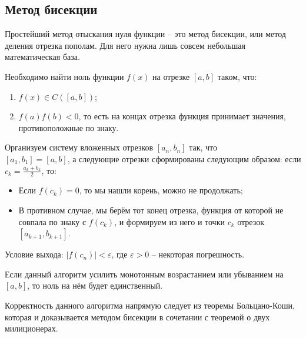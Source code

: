 \documentclass[../main.tex]{subfile}
\begin{document}
\subsection{Метод бисекции}

Простейший метод отыскания нуля функции -- это метод бисекции, или метод
деления отрезка пополам. Для него нужна лишь совсем небольшая математическая
база.

\begin{algorithm}\label{eq:bisection_method}
	Необходимо найти ноль функции $f(x)$ на отрезке $[a,b]$ таком, что:
	\begin{enumerate}
		\item $f(x)\in C([a,b])$;
		\item $f(a)f(b)<0$, то есть на концах отрезка функция
			принимает значения, противоположные по знаку.
	\end{enumerate}

	Организуем систему вложенных отрезков $[a_n, b_n]$ так, что\\
	$[a_1, b_1]=[a,b]$, а следующие отрезки сформированы следующим образом:
	если $c_k=\frac{a_k+b_k}{2}$, то:
	\begin{itemize}[noitemsep, nolistsep]
		\item Если $f(c_k)=0$, то мы нашли корень, можно не продолжать;
		\item В противном случае, мы берём тот конец отрезка, функция от
			которой не совпала по знаку с $f(c_k)$, и формируем из
			него и точки $c_k$ отрезок $[a_{k+1},b_{k+1}]$.
	\end{itemize}

	Условие выхода: $|f(c_n)|<\varepsilon$, где $\varepsilon>0$ -- некоторая
	погрешность.

	Если данный алгоритм усилить монотонным возрастанием или убыванием на
	$[a,b]$, то ноль на нём будет единственный.
\end{algorithm}

Корректность данного алгоритма напрямую следует из теоремы Больцано-Коши, которая
и доказывается методом бисекции в сочетании с теоремой о двух милиционерах.
\end{document}
